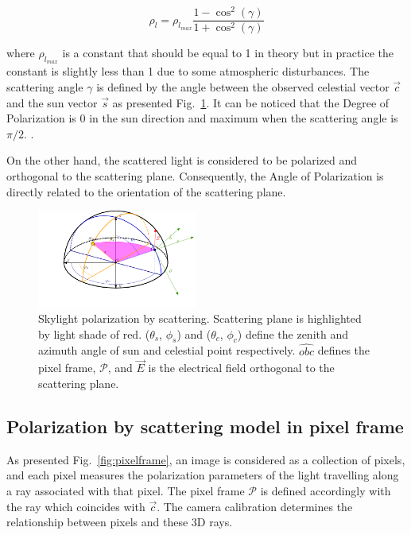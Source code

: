 \begin{equation}
  \label{eq:3}
  \rho_{l} = \rho_{l_{max}}\frac{1 - \cos^{2}(\gamma)}{1 + \cos^{
      2}(\gamma)}
\end{equation}

where $\rho_{l_{max}}$ is a constant that should be equal to 1 in theory but in practice
the constant is slightly less than 1 due to some atmospheric disturbances\cite{pomozi2001clearsky}.
The scattering angle $\gamma$ is defined by the angle between the observed celestial vector $\vec{c}$ and the sun
vector $\vec{s}$ as presented Fig.~\ref{fig:scattering}. It can be noticed that
the Degree of Polarization is 0 in the sun direction and maximum when the scattering angle is $\pi/2$.
\cite{smith2007polarization, miyazaki09sunlightpolarization}.

On the other hand, the scattered light is considered to be polarized and
orthogonal to the scattering plane.  Consequently, the Angle of Polarization is
directly related to the orientation of the scattering plane.

\begin{figure}
  \centering
  \includegraphics[width=0.47\textwidth]{./content/intro/figures/polasky-iros.pdf}
  \caption{Skylight polarization by scattering. Scattering plane is highlighted
  by light shade of red. ($\theta_s$, $\phi_s$) and ($\theta_c$, $\phi_c$)
  define the zenith and azimuth angle of sun and celestial point
  respectively. $\widehat{obc}$ defines the pixel frame, $\mathcal{P}$, and
  $\vec{E}$ is the electrical field orthogonal to the scattering plane.}
    \label{fig:scattering}
\end{figure}


\subsection{Polarization by scattering model in pixel frame}
\label{subsec:pscattering}
As presented Fig.~\ref{fig:pixelframe}, an image is considered as a collection
of pixels, and each pixel measures the polarization parameters of the light
travelling along a ray associated with that pixel. The pixel frame
$\mathcal{P}$ is defined accordingly with the ray which coincides with
$\vec{c}$. The camera calibration determines the relationship between pixels
and these 3D rays.

